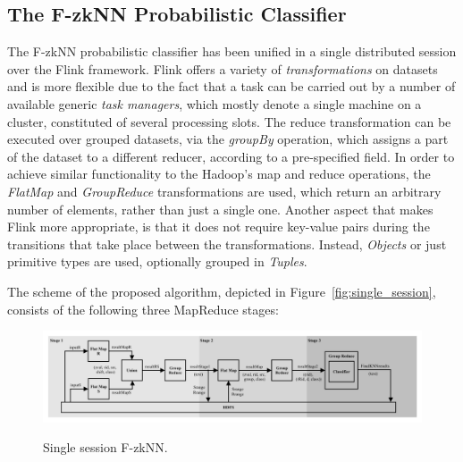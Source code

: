 \subsection{The F-zkNN Probabilistic Classifier} 
\label{sec:sec_alg}
The F-zkNN probabilistic classifier has been unified in a single distributed session over the Flink framework. Flink offers a variety of \textit{transformations} on datasets and is more flexible due to the fact that a task can be carried out by a number of available generic \textit{task managers}, which mostly denote a single machine on a cluster, constituted of several processing slots. The reduce transformation can be executed over grouped datasets, via the \textit{groupBy} operation, which assigns a part of the dataset to a different reducer, according to a pre-specified field. In order to achieve similar functionality to the Hadoop's map and reduce operations, the \textit{FlatMap} and \textit{GroupReduce} transformations are used, which return an arbitrary number of elements, rather than just a single one. Another aspect that makes Flink more appropriate, is that it does not require key-value pairs during the transitions that take place between the transformations. Instead, \textit{Objects} or just primitive types are used, optionally grouped in \textit{Tuples}. 

The scheme of the proposed algorithm, depicted in Figure~\ref{fig:single_session}, consists of the following three MapReduce stages:

\begin{figure}[htbp]
	\centering
	\includegraphics[width=\textwidth]{figures/singlesession.png}
	\caption{Single session F-zkNN.}{}
	\label{fig:singlesession}
\end{figure}


